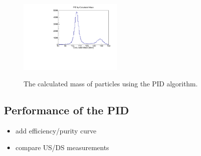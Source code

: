 \begin{figure}
{\centering\includegraphics[width=0.45\textwidth]{07-PID/plots/calc_mass.pdf}}
\caption{The calculated mass of particles using the PID algorithm.}
\label{fig:pid_mass}
\end{figure}


\subsection{Performance of the PID}
\label{SubSect:PID_Performance}
{\color{red}
\begin{itemize}
\item add efficiency/purity curve
\item compare US/DS measurements
\end{itemize}
}

